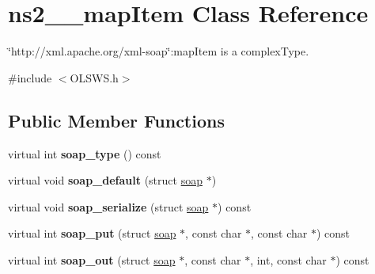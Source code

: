 \hypertarget{classns2____mapItem}{
\section{ns2\_\-\_\-mapItem Class Reference}
\label{classns2____mapItem}
}


\char`\"{}http://xml.apache.org/xml-\/soap\char`\"{}:mapItem is a complexType.  




{\ttfamily \#include $<$OLSWS.h$>$}

\subsection*{Public Member Functions}
\begin{DoxyCompactItemize}
\item 
\hypertarget{classns2____mapItem_ae3ccaf40fb71a416c9815b4f350bb7f1}{
virtual int {\bfseries soap\_\-type} () const }
\label{classns2____mapItem_ae3ccaf40fb71a416c9815b4f350bb7f1}

\item 
\hypertarget{classns2____mapItem_a0987fb594402d2a0d6247e255c925aa3}{
virtual void {\bfseries soap\_\-default} (struct \hyperlink{classns2____mapItem_a1d78106dfdd587fa9e2dbfecbd5bc790}{soap} $\ast$)}
\label{classns2____mapItem_a0987fb594402d2a0d6247e255c925aa3}

\item 
\hypertarget{classns2____mapItem_a28fd5df0925894739333c5946b5b3ffb}{
virtual void {\bfseries soap\_\-serialize} (struct \hyperlink{classns2____mapItem_a1d78106dfdd587fa9e2dbfecbd5bc790}{soap} $\ast$) const }
\label{classns2____mapItem_a28fd5df0925894739333c5946b5b3ffb}

\item 
\hypertarget{classns2____mapItem_a7f51adca8561748de1e7961820077da9}{
virtual int {\bfseries soap\_\-put} (struct \hyperlink{classns2____mapItem_a1d78106dfdd587fa9e2dbfecbd5bc790}{soap} $\ast$, const char $\ast$, const char $\ast$) const }
\label{classns2____mapItem_a7f51adca8561748de1e7961820077da9}

\item 
\hypertarget{classns2____mapItem_a07acab02fe904327895ecf3775459cfb}{
virtual int {\bfseries soap\_\-out} (struct \hyperlink{classns2____mapItem_a1d78106dfdd587fa9e2dbfecbd5bc790}{soap} $\ast$, const char $\ast$, int, const char $\ast$) const }
\label{classns2____mapItem_a07acab02fe904327895ecf3775459cfb}


\end{DoxyCompactItemize}
